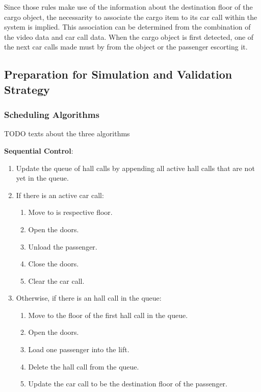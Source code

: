 Since those rules make use of the information about the destination floor of the cargo object, the necessarity to associate the cargo item to its car call within the system is implied.
This association can be determined from the combination of the video data and car call data.
When the cargo object is first detected, one of the next car calls made must by from the object or the passenger escorting it.

\subsection{Preparation for Simulation and Validation Strategy}

\subsubsection{Scheduling Algorithms}

TODO texts about the three algorithms

\textbf{Sequential Control}:
\begin{enumerate}[noitemsep]
    \item Update the queue of hall calls by appending all active hall calls that are not yet in the queue.
    \item If there is an active car call:
    \begin{enumerate}[noitemsep]
        \item Move to is respective floor.
        \item Open the doors.
        \item Unload the passenger. 
        \item Close the doors. 
        \item Clear the car call.
    \end{enumerate}
    \item Otherwise, if there is an hall call in the queue:
    \begin{enumerate}[noitemsep]
        \item Move to the floor of the first hall call in the queue. 
        \item Open the doors.
        \item Load one passenger into the lift. 
        \item Delete the hall call from the queue.
        \item Update the car call to be the destination floor of the passenger.
    \end{enumerate}
\end{enumerate}

